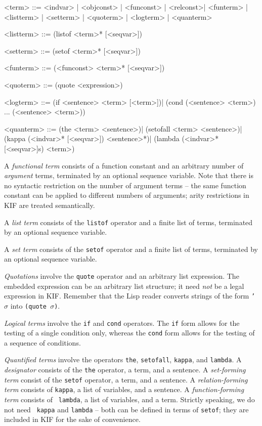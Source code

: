 \medskip
\beginverbatim
<term> ::= <indvar> | <objconst> | <funconst> | <relconst>|
           <funterm> | <listterm> | <setterm> |
           <quoterm> | <logterm> | <quanterm>

<listterm> ::= (listof <term>* [<seqvar>])

<setterm> ::= (setof <term>* [<seqvar>])

<funterm> ::= (<funconst> <term>* [<seqvar>])

<quoterm> ::= (quote <expression>)

<logterm> ::= (if <sentence> <term> [<term>])|
              (cond (<sentence> <term>) ... (<sentence> <term>))

<quanterm> ::= (the <term> <sentence>)|
               (setofall <term> <sentence>)|
               (kappa (<indvar>* [<seqvar>]) <sentence>*)|
               (lambda (<indvar>* [<seqvar>]s) <term>)
\endverbatim
\medskip

A {\it functional term} consists of a function constant and an arbitrary number
of {\it argument} terms, terminated by an optional sequence variable.  Note that
there is no syntactic  restriction on the number of argument terms -- the same
function constant can be applied to different numbers of arguments; arity
restrictions in KIF are treated semantically.

A {\it list term} consists of the {\tt listof} operator and a finite list of
terms, terminated by an optional sequence variable. 

A {\it set term} consists of the {\tt setof} operator and a finite list of
terms, terminated by an optional sequence variable. 

{\it Quotations} involve the {\tt quote} operator and an arbitrary list
expression.  The embedded expression can be an arbitrary list structure; it need
{\it not} be a legal expression in KIF.  Remember that the Lisp reader converts
strings of the form {\tt '$\sigma$} into {\tt (quote $\sigma$)}.

{\it Logical terms} involve the {\tt if} and {\tt cond} operators.  The {\tt if}
form allows for the testing of a single condition only, whereas the {\tt cond}
form allows for the testing of a sequence of conditions.

{\it Quantified terms} involve the operators {\tt the}, {\tt setofall}, {\tt kappa},
and {\tt lambda}.  A {\it designator} consists of the {\tt the} operator, a term,
and a sentence.  A {\it set-forming term} consist of the {\tt setof} operator, a
term, and a sentence.  A {\it relation-forming term} consists of {\tt kappa}, a
list of variables, and a sentence.  A {\it function-forming term} consists of {\tt
lambda}, a list of variables, and a term.  Strictly speaking, we do not need {\tt
kappa} and {\tt lambda} -- both can be defined in terms of {\tt setof}; they are
included in KIF for the sake of convenience.

